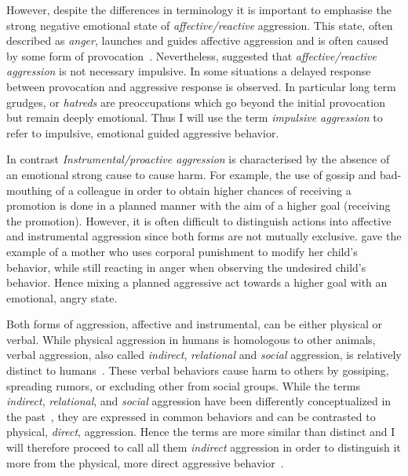 \documentclass[../header.tex]{subfiles}
\begin{document}
However, despite the differences in terminology it is important to emphasise the strong negative emotional state of \textit{affective/reactive} aggression.
This state, often described as \textit{anger}, launches and guides affective aggression  and is often caused by some form of provocation~\cite{Geen2001}.
Nevertheless, \citet{Frijda1994} suggested that \textit{affective/reactive aggression} is not necessary impulsive.
In some situations a delayed response between provocation and aggressive response is observed. 
In particular long term grudges, or \textit{hatreds} are preoccupations which go beyond the initial provocation but remain deeply emotional.
Thus I will use the term \textit{impulsive aggression} to refer to impulsive, emotional guided aggressive behavior.

In contrast \textit{Instrumental/proactive aggression} is characterised by the absence of an emotional strong cause to cause harm.
For example, the use of gossip and bad-mouthing of a colleague in order to obtain higher chances of receiving a promotion is done in a planned manner with the aim of a higher goal (receiving the promotion).
However, it is often difficult to distinguish actions into affective and instrumental aggression since both forms are not mutually exclusive.
\citet{Geen2001} gave the example of a mother who uses corporal punishment to modify her child's behavior, while still reacting in anger when observing the undesired child's behavior.
Hence mixing a planned aggressive act towards a higher goal with an emotional, angry state.

Both forms of aggression, affective and instrumental, can be either physical or verbal.
While physical aggression in humans is homologous to other animals, verbal aggression, also called \textit{indirect}, \textit{relational} and \textit{social} aggression, is relatively distinct to humans~\cite{Archer2005}.
These verbal behaviors cause harm to others by gossiping, spreading rumors, or excluding other from social groups.
While the terms \textit{indirect}, \textit{relational}, and \textit{social} aggression have been differently conceptualized in the past~\cite{Archer2001}, they are expressed in common behaviors and can be contrasted to physical, \textit{direct}, aggression.
Hence the terms are more similar than distinct and I will therefore proceed to call all them \textit{indirect} aggression in order to distinguish it more from the physical, more direct aggressive behavior~\cite{Archer2005}.
\end{document}
